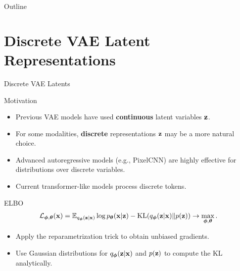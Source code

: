 \documentclass{beamer}
\begin{document}
\begin{frame}{Outline}
	\tableofcontents
\end{frame}
\section{Discrete VAE Latent Representations}
\begin{frame}{Discrete VAE Latents}
	\begin{block}{Motivation}
		\begin{itemize}
			\item Previous VAE models have used \textbf{continuous} latent variables $\mathbf{z}$.
			\item For some modalities, \textbf{discrete} representations $\mathbf{z}$ may be a more natural choice.
			\item Advanced autoregressive models (e.g., PixelCNN) are highly effective for distributions over discrete variables.
			\item Current transformer-like models process discrete tokens.
		\end{itemize}
	\end{block}
	\eqpause
	\begin{block}{ELBO}
		\vspace{-0.3cm}
		\[
			\mathcal{L}_{\boldsymbol{\phi}, \boldsymbol{\theta}}(\mathbf{x})  = \mathbb{E}_{q_{\boldsymbol{\phi}}(\mathbf{z}| \mathbf{x})} \log p_{\boldsymbol{\theta}}(\mathbf{x}| \mathbf{z}) - \mathrm{KL}(q_{\boldsymbol{\phi}}(\mathbf{z}| \mathbf{x}) \| p(\mathbf{z})) \rightarrow \max_{\boldsymbol{\phi}, \boldsymbol{\theta}}.
		\]
		\vspace{-0.5cm}
	\end{block}
	\eqpause
	\begin{itemize}
		\item Apply the reparametrization trick to obtain unbiased gradients.
		\item Use Gaussian distributions for $q_{\boldsymbol{\phi}}(\mathbf{z}| \mathbf{x})$ and $p(\mathbf{z})$ to compute the KL analytically.
	\end{itemize}
\end{frame}
\end{document}
